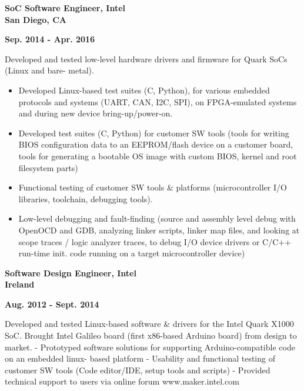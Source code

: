 \documentclass[6pt]{article}
\begin{document}
\begin{minipage}{35em}
\begin{minipage}{20em}
{\bfseries SoC Software Engineer, Intel \\
San Diego, CA}
\end{minipage}
\hfill
\begin{minipage}{14em}
{
    \bfseries \hfill Sep. 2014 - Apr. 2016 \\

}
\end{minipage}
\break
\break
Developed and tested low-level hardware drivers and firmware for Quark SoCs (Linux and bare-
metal).
\begin{itemize}
    \item Developed Linux-based test suites (C, Python), for various embedded protocols and
          systems (UART, CAN, I2C, SPI), on FPGA-emulated systems and during new device
          bring-up/power-on.
    \item Developed test suites (C, Python) for customer SW tools (tools for writing BIOS
          configuration data to an EEPROM/flash device on a customer board, tools for
          generating a bootable OS image with custom BIOS, kernel and root filesystem parts)
    \item Functional testing of customer SW tools \& platforms (microcontroller I/O libraries, toolchain,
          debugging tools).
    \item Low-level debugging and fault-finding (source and assembly level debug with OpenOCD and GDB,
          analyzing linker scripts, linker map files, and looking at scope traces / logic analyzer traces, to
          debug I/O device drivers or C/C++ run-time init. code running on a target microcontroller device)
\end{itemize}

\hspace*{-\parindent}%
\begin{minipage}{20em}
{\bfseries Software Design Engineer, Intel \\
Ireland}
\end{minipage}
\hfill
\begin{minipage}{14em}
{
    \bfseries \hfill Aug. 2012 - Sept. 2014 \\

}
\end{minipage}
\break
\break
Developed and tested Linux-based software \& drivers for the Intel Quark X1000 SoC. Brought Intel
Galileo board (first x86-based Arduino board) from design to market.
- Prototyped software solutions for supporting Arduino-compatible code on an embedded linux-
based platform
- Usability and functional testing of customer SW tools (Code editor/IDE, setup tools and scripts)
- Provided technical support to users via online forum www.maker.intel.com


\end{minipage}
\end{document}

